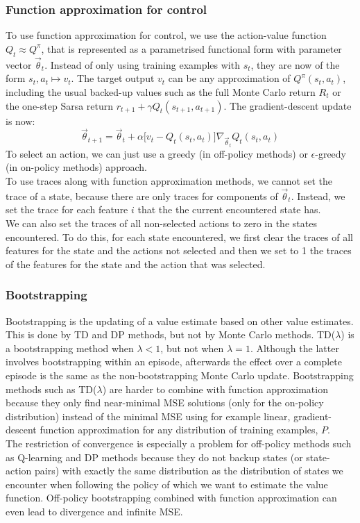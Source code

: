 \documentclass[a4paper]{article}
\begin{document}
\subsubsection{Function approximation for control}
To use function approximation for control, we use the action-value function $Q_t \approx Q^{\pi}$, that is represented as a parametrised functional form with parameter vector $\overrightarrow{\theta}_t$. Instead of only using training examples with $s_t$, they are now of the form $s_t, a_t \mapsto v_t$. The target output $v_t$ can be any approximation of $Q^{\pi}(s_t,a_t)$, including the usual backed-up values such as the full Monte Carlo return $R_t$ or the one-step Sarsa return $r_{t+1} + \gamma Q_t(s_{t+1}, a_{t+1})$. The gradient-descent update is now:
\begin{equation}
\overrightarrow{\theta}_{t+1} = \overrightarrow{\theta}_t + \alpha \big[ v_t - Q_t(s_t,a_t) \big] \nabla_{\overrightarrow{\theta}_t} Q_t(s_t,a_t)
\end{equation}
To select an action, we can just use a greedy (in off-policy methods) or $\epsilon$-greedy (in on-policy methods) approach.\\
To use traces along with function approximation methods, we cannot set the trace of a state, because there are only traces for components of $\overrightarrow{\theta}_t$. Instead, we set the trace for each feature $i$ that the the current encountered state has.\\
We can also set the traces of all non-selected actions to zero in the states encountered. To do this, for each state encountered, we first clear the traces of all features for the state and the actions not selected and then we set to 1 the traces of the features for the state and the action that was selected.\\

\subsubsection{Bootstrapping}
Bootstrapping is the updating of a value estimate based on other value estimates. This is done by TD and DP methods, but not by Monte Carlo methods. TD($\lambda$) is a bootstrapping method when $\lambda <1$, but not when $\lambda = 1$. Although the latter involves bootstrapping within an episode, afterwards the effect over a complete episode is the same as the non-bootstrapping Monte Carlo update. Bootstrapping methods such as TD($\lambda$) are harder to combine with function approximation because they only find near-minimal MSE solutions (only for the on-policy distribution) instead of the minimal MSE using for example linear, gradient-descent function approximation for any distribution of training examples, $P$.\\
The restriction of convergence is especially a problem for off-policy methods such as Q-learning and DP methods because they do not backup states (or state-action pairs) with exactly the same distribution as the distribution of states we encounter when following the policy of which we want to estimate the value function. Off-policy bootstrapping combined with function approximation can even lead to divergence and infinite MSE.\\
\end{document}
